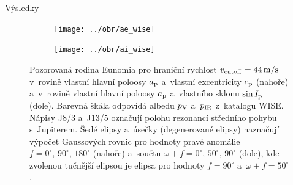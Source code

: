 \documentclass{beamer}
\newlength{\vyskaB}
\newlength{\main}
\begin{document}
\begin{frame}
\begin{columns}[t]
\begin{column}{\main}
\begin{block}{Výsledky\phantom{Úy}}
\begin{minipage}[t][1.0\vyskaB][t]{\textwidth}
			\begin{figure}
				\centering
				\begin{subfigure}[t]{0.49\textwidth}
				\texttt{[image: ../obr/ae\_wise]}
				\end{subfigure}
				\begin{subfigure}[t]{0.49\textwidth}
				\texttt{[image: ../obr/ai\_wise]}
				\end{subfigure}
				\caption{Pozorovaná rodina Eunomia pro hraniční rychlost $v_{\rm cutoff} = 44\,{\rm m/s}$ v~rovině vlastní hlavní poloosy $a_{\rm p}$ a~vlastní excentricity $e_{\rm p}$ (nahoře) a~v~rovině vlastní hlavní poloosy $a_{\rm p}$ a~vlastního sklonu $\sin I_{\rm p}$ (dole). Barevná škála odpovídá albedu $p_{\rm V}$ a~$p_{\rm IR}$ z~katalogu WISE\@. Nápisy J8/3 a~J13/5 označují polohu rezonancí středního pohybu s~Jupiterem. Šedé elipsy a~úsečky (degenerované elipsy) naznačují výpočet Gaussových rovnic pro hodnoty pravé anomálie $f=0^\circ,\,90^\circ,\,180^\circ$ (nahoře) a~součtu $\omega+f=0^\circ,\, 50^\circ,\, 90^\circ$ (dole), kde zvolenou tučnější elipsou je elipsa pro hodnoty $f=90^\circ$ a~$\omega+f=50^\circ$.}
				\label{fig:ae_ai_wise}
			\end{figure}


\end{minipage}
\end{block}
\end{column}
\end{columns}
\end{frame}
\end{document}
